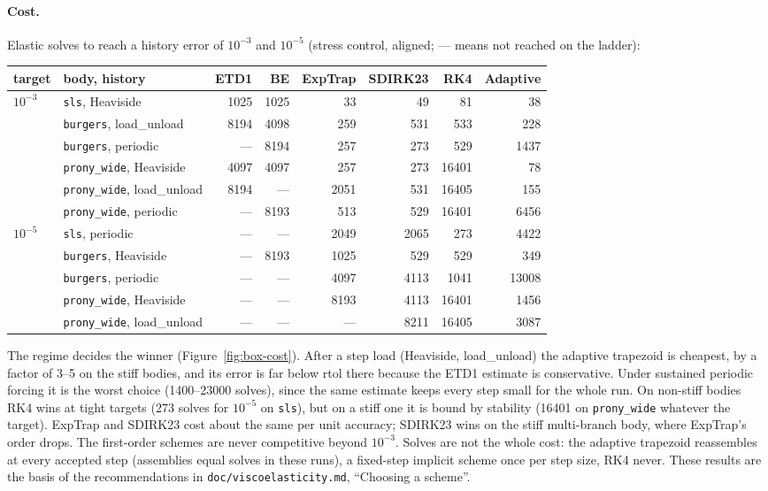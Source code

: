 \documentclass[11pt]{article}
\numberwithin{equation}{section}
\newcommand{\code}[1]{\texttt{#1}}
\begin{document}
\paragraph{Cost.}
Elastic solves to reach a history error of $10^{-3}$ and $10^{-5}$
(stress control, aligned; --- means not reached on the ladder):
\begin{center}
\small
\begin{tabular}{@{}llrrrrrr@{}}
\toprule
target & body, history & ETD1 & BE & ExpTrap & SDIRK23 & RK4 & Adaptive \\
\midrule
$10^{-3}$ & \code{sls}, Heaviside & 1025 & 1025 & 33 & 49 & 81 & 38 \\
 & \code{burgers}, load\_unload & 8194 & 4098 & 259 & 531 & 533 & 228 \\
 & \code{burgers}, periodic & --- & 8194 & 257 & 273 & 529 & 1437 \\
 & \code{prony\_wide}, Heaviside & 4097 & 4097 & 257 & 273 & 16401 & 78 \\
 & \code{prony\_wide}, load\_unload & 8194 & --- & 2051 & 531 & 16405 & 155 \\
 & \code{prony\_wide}, periodic & --- & 8193 & 513 & 529 & 16401 & 6456 \\
\midrule
$10^{-5}$ & \code{sls}, periodic & --- & --- & 2049 & 2065 & 273 & 4422 \\
 & \code{burgers}, Heaviside & --- & 8193 & 1025 & 529 & 529 & 349 \\
 & \code{burgers}, periodic & --- & --- & 4097 & 4113 & 1041 & 13008 \\
 & \code{prony\_wide}, Heaviside & --- & --- & 8193 & 4113 & 16401 & 1456 \\
 & \code{prony\_wide}, load\_unload & --- & --- & --- & 8211 & 16405 & 3087 \\
\bottomrule
\end{tabular}
\end{center}
The regime decides the winner (Figure~\ref{fig:box-cost}). After a step
load (Heaviside, load\_unload) the adaptive trapezoid is cheapest, by a
factor of 3--5 on the stiff bodies, and its error is far below rtol there
because the ETD1 estimate is conservative. Under sustained periodic
forcing it is the worst choice (1400--23000 solves), since the same
estimate keeps every step small for the whole run. On non-stiff bodies
RK4 wins at tight targets (273 solves for $10^{-5}$ on \code{sls}), but on
a stiff one it is bound by stability (16401 on \code{prony\_wide} whatever
the target). ExpTrap and SDIRK23 cost about the same per unit accuracy;
SDIRK23 wins on the stiff multi-branch body, where ExpTrap's order drops.
The first-order schemes are never competitive beyond $10^{-3}$. Solves are
not the whole cost: the adaptive trapezoid reassembles at every accepted
step (assemblies equal solves in these runs), a fixed-step implicit scheme
once per step size, RK4 never. These results are the basis of the
recommendations in \code{doc/viscoelasticity.md}, ``Choosing a scheme''.
\end{document}
